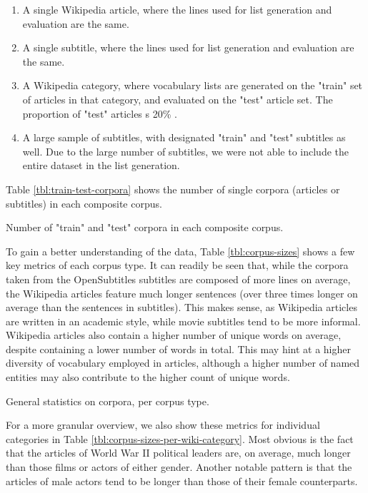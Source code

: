 \begin{enumerate}
	\item A single Wikipedia article, where the lines used for list generation and evaluation are the same.
	\item A single subtitle, where the lines used for list generation and evaluation are the same.
	\item A Wikipedia category, where vocabulary lists are generated on the "train" set of articles in that category, and evaluated on the "test" article set. The proportion of "test" articles s 20\% .
	\item A large sample of subtitles, with designated "train" and "test" subtitles as well. Due to the large number of subtitles, we were not able to include the entire dataset in the list generation.
\end{enumerate}

Table \ref{tbl:train-test-corpora} shows the number of single corpora (articles or subtitles) in each composite corpus.

\begin{table}[ht]
	\centering
	
	\caption{Number of "train" and "test" corpora in each composite corpus.}
	\label{tbl:train-test-corpora}
\end{table}


To gain a better understanding of the data, Table \ref{tbl:corpus-sizes} shows a few key metrics of each corpus type.
It can readily be seen that, while the corpora taken from the OpenSubtitles subtitles are composed of more lines on average, the Wikipedia articles feature much longer sentences (over three times longer on average than the sentences in subtitles).
This makes sense, as Wikipedia articles are written in an academic style, while movie subtitles tend to be more informal.
Wikipedia articles also contain a higher number of unique words on average, despite containing a lower number of words in total.
This may hint at a higher diversity of vocabulary employed in articles, although a higher number of named entities may also contribute to the higher count of unique words.

\begin{table}[ht]
	\centering
	
	\caption{General statistics on corpora, per corpus type.}
	\label{tbl:corpus-sizes}
\end{table}


For a more granular overview, we also show these metrics for individual categories in Table \ref{tbl:corpus-sizes-per-wiki-category}.
Most obvious is the fact that the articles of World War II political leaders are, on average, much longer than those films or actors of either gender.
Another notable pattern is that the articles of male actors tend to be longer than those of their female counterparts.


